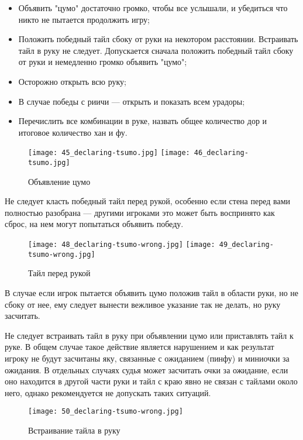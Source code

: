\begin{itemize}
	\item Объявить "цумо" достаточно громко, чтобы все услышали, и убедиться что никто не пытается продолжить игру;
	\item Положить победный тайл сбоку от руки на некотором расстоянии. Встраивать тайл в руку не следует. Допускается сначала положить победный тайл сбоку от руки и немедленно громко объявить "цумо";
	\item Осторожно открыть всю руку;
	\item В случае победы с риичи --- открыть и показать всем урадоры;
	\item Перечислить все комбинации в руке, назвать общее количество дор и итоговое количество хан и фу.
\end{itemize}

\begin{figure}[H]
	\centering
	\texttt{[image: 45\_declaring-tsumo.jpg]}
	\texttt{[image: 46\_declaring-tsumo.jpg]}
	\caption{Объявление цумо}
\end{figure}

Не следует класть победный тайл перед рукой, особенно если стена перед вами полностью разобрана --- другими игроками это может быть воспринято как сброс, на нем могут попытаться объявить победу.

\begin{figure}[H]
	\centering
	\texttt{[image: 48\_declaring-tsumo-wrong.jpg]}
	\texttt{[image: 49\_declaring-tsumo-wrong.jpg]}
	\caption{Тайл перед рукой}
\end{figure}

В случае если игрок пытается объявить цумо положив тайл в области руки, но не сбоку от нее, ему следует вынести вежливое указание так не делать, но руку засчитать. 

\newpage

Не следует встраивать тайл в руку при объявлении цумо или приставлять тайл к руке. В общем случае такое действие является нарушением и как результат игроку не будут засчитаны яку, связанные с ожиданием (пинфу) и миниочки за ожидания. В отдельных случаях судья может засчитать очки за ожидание, если оно находится в другой части руки и тайл с краю явно не связан с тайлами около него, однако рекомендуется не допускать таких ситуаций.

\begin{figure}[H]
	\centering
	\texttt{[image: 50\_declaring-tsumo-wrong.jpg]}
	\caption{Встраивание тайла в руку}
\end{figure}

